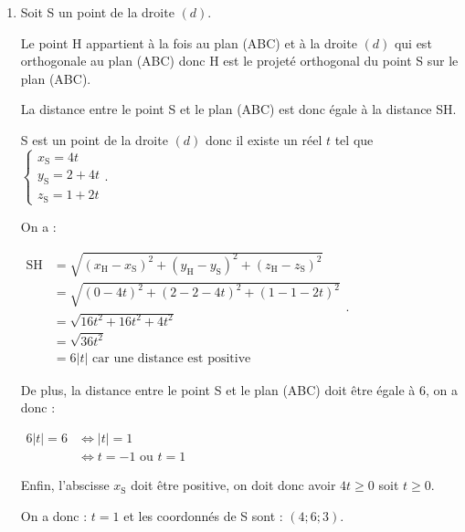 \documentclass[10pt]{article}
\begin{document}
\begin{enumerate}
	\item   Soit S un point de la droite $(d)$.

	Le point H appartient à la fois au plan (ABC) et à  la droite $(d)$  qui est orthogonale au plan (ABC) donc H est le projeté orthogonal du point S sur le plan (ABC).

	La distance entre le point S et  le plan (ABC) est donc égale à la distance SH.

	S est un point de la droite $(d)$ donc il existe un réel $t$ tel que  $\begin{cases}
		x_\mathrm{S} = 4t \\ y_\mathrm{S}=2+4t \\z_\mathrm{S}=1 +2t \end{cases}$.

	On a :

	$\begin{aligned} \mathrm{SH} &= \sqrt{{ \left(  x_\mathrm{H}-x_\mathrm{S} \right)}^2 +  { \left(  y_\mathrm{H}-y_\mathrm{S} \right)}^2+{ \left(  z_\mathrm{H}-z_\mathrm{S} \right)}^2} \\
		& = \sqrt{ (0 - 4t)^2 + (2-2-4t)^2 + (1- 1-2t)^2}\\
		&= \sqrt{16t^2+16t^2+4t^2}\\
		&= \sqrt{36t^2} \\
		&=6 |t| \text{ car une distance est positive}
	\end{aligned}$.


	De plus, la distance entre le point S et le plan (ABC) doit être égale à 6, on a donc :

	$ \begin{aligned} 6 |t| =6  &\iff  |t| = 1\\
		&\iff   t = - 1\text{ ou } t =  1
	\end{aligned}$

	Enfin, l'abscisse $x_{\mathrm{S}}$ doit être positive, on doit donc avoir $4t \geq 0$ soit $t\geq 0$.

	On a donc : $t=1$ et les coordonnés de S sont : $(4;6;3)$.


\end{enumerate}
\end{document}
